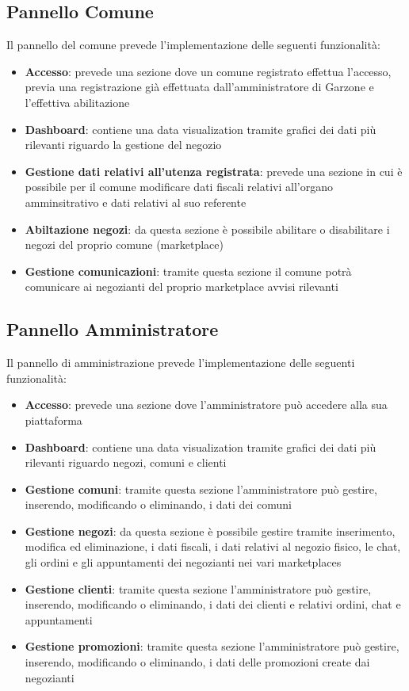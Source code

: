 \subsection{Pannello Comune} Il pannello del comune prevede l'implementazione delle seguenti funzionalità:
\begin{itemize}
    \item \textbf{Accesso}: prevede una sezione dove un comune registrato effettua l'accesso, previa una registrazione già effettuata dall'amministratore di Garzone e l'effettiva abilitazione
    \item \textbf{Dashboard}: contiene una data visualization tramite grafici dei dati più rilevanti riguardo la gestione del negozio
    \item \textbf{Gestione dati relativi all'utenza registrata}: prevede una sezione in cui è possibile per il comune modificare dati fiscali relativi all'organo amminsitrativo e dati relativi al suo referente
    \item \textbf{Abiltazione negozi}: da questa sezione è possibile abilitare o disabilitare i negozi del proprio comune (marketplace)
    \item \textbf{Gestione comunicazioni}: tramite questa sezione il comune potrà comunicare ai negozianti del proprio marketplace avvisi rilevanti
\end{itemize}
\subsection{Pannello Amministratore} Il pannello di amministrazione prevede l'implementazione delle seguenti funzionalità:
\begin{itemize}
    \item \textbf{Accesso}: prevede una sezione dove l'amministratore può accedere alla sua piattaforma
    \item \textbf{Dashboard}: contiene una data visualization tramite grafici dei dati più rilevanti riguardo negozi, comuni e clienti
    \item \textbf{Gestione comuni}: tramite questa sezione l'amministratore può gestire, inserendo, modificando o eliminando, i dati dei comuni
    \item \textbf{Gestione negozi}: da questa sezione è possibile gestire tramite inserimento, modifica ed eliminazione, i dati fiscali, i dati relativi al negozio fisico, le chat, gli ordini e gli appuntamenti dei negozianti nei vari marketplaces
    \item \textbf{Gestione clienti}: tramite questa sezione l'amministratore può gestire, inserendo, modificando o eliminando, i dati dei clienti e relativi ordini, chat e appuntamenti
    \item \textbf{Gestione promozioni}: tramite questa sezione l'amministratore può gestire, inserendo, modificando o eliminando, i dati delle promozioni create dai negozianti
\end{itemize}
